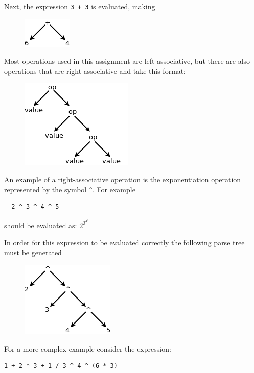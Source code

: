 \documentclass{article}
\newcommand{\code}[1]{\texttt{\textmd{#1}}}
\begin{document}
Next, the expression \code{3 + 3} is evaluated, making
\begin{figure}[H]
  \centering
  \includegraphics{static/left-assoc-plus-3.png}
\end{figure}

Most operations used in this assignment are left associative, but there are also operations that
are right associative and take this format:
\begin{figure}[H]
  \centering
  \includegraphics{static/right-assoc-gen.png}
\end{figure}

An example of a right-associative operation is the exponentiation operation represented by the
symbol \code{\textasciicircum}. For example
\begin{lstlisting}
  2 ^ 3 ^ 4 ^ 5
\end{lstlisting}

should be evaluated as:
\begin{math}
  2 ^ {\displaystyle 3 ^ {\displaystyle 4 ^ {\displaystyle 5 }}}
\end{math}

In order for this expression to be evaluated correctly the following parse tree must be generated
\begin{figure}[H]
  \centering
  \includegraphics{static/right-assoc-pow.png}
\end{figure}

For a more complex example consider the expression:
\begin{lstlisting}
1 + 2 * 3 + 1 / 3 ^ 4 ^ (6 * 3)
\end{lstlisting}
\end{document}
